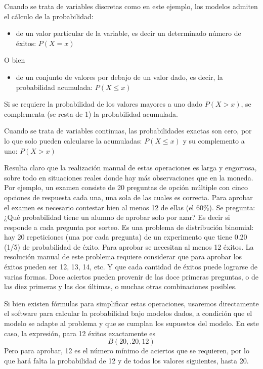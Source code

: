 \documentclass[]{book}
\providecommand{\tightlist}{%
  \setlength{\itemsep}{0pt}\setlength{\parskip}{0pt}}
\begin{document}
Cuando se trata de variables discretas como en este ejemplo, los modelos admiten el cálculo de la probabilidad:

\begin{itemize}
\tightlist
\item
  de un valor particular de la variable, es decir un determinado número de éxitos: \(P(X=x)\)
\end{itemize}

O bien

\begin{itemize}
\tightlist
\item
  de un conjunto de valores por debajo de un valor dado, es decir, la probabilidad acumulada: \(P(X\leq x)\)
\end{itemize}

Si se requiere la probabilidad de los valores mayores a uno dado \(P(X>x)\), se complementa (se resta de 1) la probabilidad acumulada.

Cuando se trata de variables continuas, las probabilidades exactas son cero, por lo que solo pueden calcularse la acumuladas: \(P(X\leq x)\) y su complemento a uno: \(P(X>x)\)

Resulta claro que la realización manual de estas operaciones es larga y engorrosa, sobre todo en situaciones reales donde hay más observaciones que en la moneda. Por ejemplo, un examen consiste de 20 preguntas de opción múltiple con cinco opciones de respuesta cada una, una sola de las cuales es correcta. Para aprobar el examen es necesario contestar bien al menos 12 de ellas (el 60\%). Se pregunta: ¿Qué probabilidad tiene un alumno de aprobar solo por azar? Es decir si responde a cada pregunta por sorteo. Es una problema de distribución binomial: hay 20 repeticiones (una por cada pregunta) de un experimento que tiene 0.20 (1/5) de probabilidad de éxito. Para aprobar se necesitan al menos 12 éxitos. La resolución manual de este problema requiere considerar que para aprobar los éxitos pueden ser 12, 13, 14, etc. Y que cada cantidad de éxitos puede lograrse de varias formas. Doce aciertos pueden provenir de las doce primeras preguntas, o de las diez primeras y las dos últimas, o muchas otras combinaciones posibles.

Si bien existen fórmulas para simplificar estas operaciones, usaremos directamente el software para calcular la probabilidad bajo modelos dados, a condición que el modelo se adapte al problema y que se cumplan los supuestos del modelo. En este caso, la expresión, para 12 éxitos exactamente es \[B(20, .20, 12)\]
Pero para aprobar, 12 es el número mínimo de aciertos que se requieren, por lo que hará falta la probabilidad de 12 y de todos los valores siguientes, hasta 20.
\end{document}

